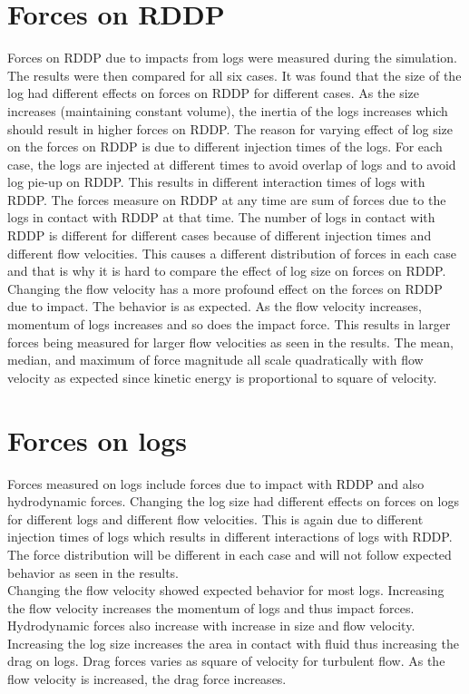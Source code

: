 \section{Forces on RDDP}
Forces on RDDP due to impacts from logs were measured during the simulation. The results were then compared for all six cases. It was found that the size of the log had different effects on forces on RDDP for different cases. As the size increases (maintaining constant volume), the inertia of the logs increases which should result in higher forces on RDDP. The reason for varying effect of log size on the forces on RDDP is due to different injection times of the logs. For each case, the logs are injected at different times to avoid overlap of logs and to avoid log pie-up on RDDP. This results in different interaction times of logs with RDDP. The forces measure on RDDP at any time are sum of forces due to the logs in contact with RDDP at that time. The number of logs in contact with RDDP is different for different cases because of different injection times and different flow velocities. This causes a different distribution of forces in each case and that is why it is hard to compare the effect of log size on forces on RDDP.\\
Changing the flow velocity has a more profound effect on the forces on RDDP due to impact. The behavior is as expected. As the flow velocity increases, momentum of logs increases and so does the impact force. This results in larger forces being measured for larger flow velocities as seen in the results. The mean, median, and maximum of force magnitude all scale quadratically with flow velocity as expected since kinetic energy is proportional to square of velocity. 

\section{Forces on logs}
Forces measured on logs include forces due to impact with RDDP and also hydrodynamic forces. Changing the log size had different effects on forces on logs for different logs and different flow velocities. This is again due to different injection times of logs which results in different interactions of logs with RDDP. The force distribution will be different in each case and will not follow expected behavior as seen in the results.\\
Changing the flow velocity showed expected behavior for most logs. Increasing the flow velocity increases the momentum of logs and thus impact forces.\\
Hydrodynamic forces also increase with increase in size and flow velocity. Increasing the log size increases the area in contact with fluid thus increasing the drag on logs. Drag forces varies as square of velocity for turbulent flow. As the flow velocity is increased, the drag force increases. 


